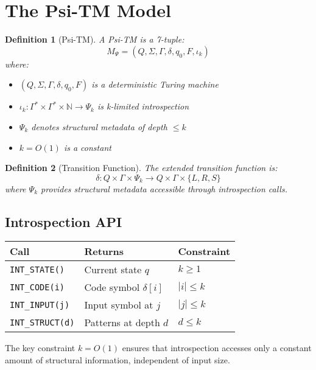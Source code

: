 \documentclass[11pt]{article}
\newtheorem{definition}{Definition}
\begin{document}
\section{The Psi-TM Model}

\begin{definition}[Psi-TM]
A Psi-TM is a 7-tuple:
$$M_\Psi = (Q, \Sigma, \Gamma, \delta, q_0, F, \iota_k)$$
where:
\begin{itemize}
\item $(Q, \Sigma, \Gamma, \delta, q_0, F)$ is a deterministic Turing machine
\item $\iota_k: \Gamma^* \times \Gamma^* \times \mathbb{N} \to \Psi_k$ is k-limited introspection
\item $\Psi_k$ denotes structural metadata of depth $\leq k$
\item $k = O(1)$ is a constant
\end{itemize}
\end{definition}

\begin{definition}[Transition Function]
The extended transition function is:
$$\delta: Q \times \Gamma \times \Psi_k \to Q \times \Gamma \times \{L, R, S\}$$
where $\Psi_k$ provides structural metadata accessible through introspection calls.
\end{definition}

\subsection{Introspection API}

\begin{center}
\begin{tabular}{|l|l|l|}
\hline
\textbf{Call} & \textbf{Returns} & \textbf{Constraint} \\
\hline
\texttt{INT\_STATE()} & Current state $q$ & $k \geq 1$ \\
\texttt{INT\_CODE(i)} & Code symbol $\delta[i]$ & $|i| \leq k$ \\
\texttt{INT\_INPUT(j)} & Input symbol at $j$ & $|j| \leq k$ \\
\texttt{INT\_STRUCT(d)} & Patterns at depth $d$ & $d \leq k$ \\
\hline
\end{tabular}
\end{center}

The key constraint $k = O(1)$ ensures that introspection accesses only a constant amount of structural information, independent of input size.
\end{document}
